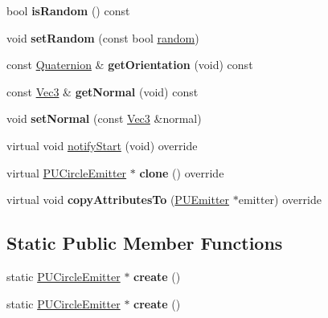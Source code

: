 \begin{DoxyCompactItemize}
bool {\bfseries is\+Random} () const
\item 
\mbox{\label{classPUCircleEmitter_aec45619e8fb64a0c93cc5be55d5a29e5}} 
void {\bfseries set\+Random} (const bool \hyperlink{group__base_ga84e4437f43bda4dd8f4cabda651f8eb7}{random})
\item 
\mbox{\label{classPUCircleEmitter_aa86ef1c3a1f7b5ae020338aeedf5b1f8}} 
const \hyperlink{classQuaternion}{Quaternion} \& {\bfseries get\+Orientation} (void) const
\item 
\mbox{\label{classPUCircleEmitter_a07d7a4fad1a9ad60a5a50badbec0328b}} 
const \hyperlink{classVec3}{Vec3} \& {\bfseries get\+Normal} (void) const
\item 
\mbox{\label{classPUCircleEmitter_a0260bbd85c1f76b88051b2cf0e641490}} 
void {\bfseries set\+Normal} (const \hyperlink{classVec3}{Vec3} \&normal)
\item 
virtual void \hyperlink{classPUCircleEmitter_a15103e9de991e89334219a8d52bb66a3}{notify\+Start} (void) override
\item 
\mbox{\label{classPUCircleEmitter_a51af25d81673949b85be93a665f4615e}} 
virtual \hyperlink{classPUCircleEmitter}{P\+U\+Circle\+Emitter} $\ast$ {\bfseries clone} () override
\item 
\mbox{\label{classPUCircleEmitter_a88571f7d02ea0588d28cf84942250e5d}} 
virtual void {\bfseries copy\+Attributes\+To} (\hyperlink{classPUEmitter}{P\+U\+Emitter} $\ast$emitter) override
\end{DoxyCompactItemize}
\subsection*{Static Public Member Functions}
\begin{DoxyCompactItemize}
\item 
\mbox{\label{classPUCircleEmitter_ab3076622a649736457c19cee3fb22dc7}} 
static \hyperlink{classPUCircleEmitter}{P\+U\+Circle\+Emitter} $\ast$ {\bfseries create} ()
\item 
\mbox{\label{classPUCircleEmitter_a9b5c89213b84be9a03f69adbc7019448}} 
static \hyperlink{classPUCircleEmitter}{P\+U\+Circle\+Emitter} $\ast$ {\bfseries create} ()
\end{DoxyCompactItemize}
